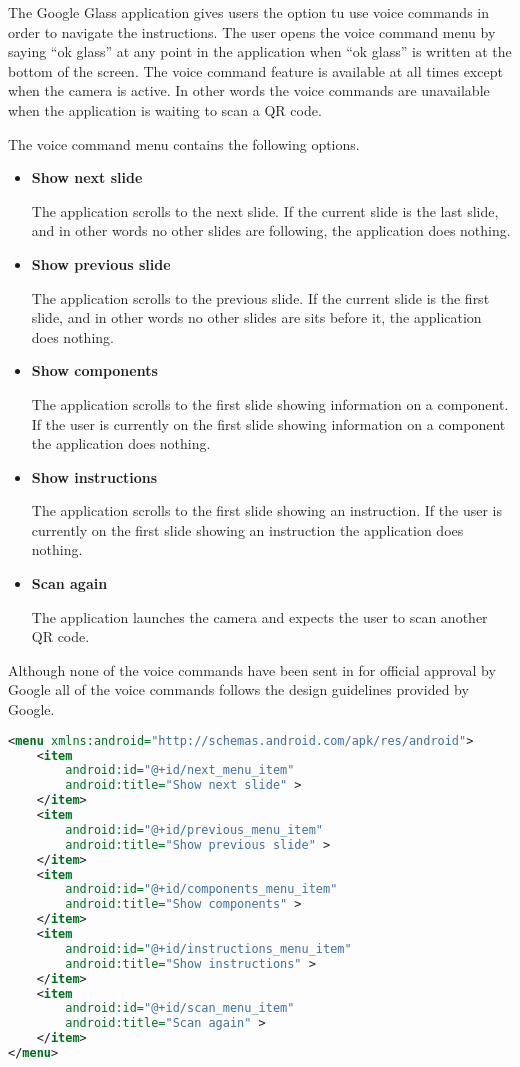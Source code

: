 The Google Glass application gives users the option tu use voice commands in order to navigate the instructions. The user opens the voice command menu by saying ``ok glass'' at any point in the application when ``ok glass'' is written at the bottom of the screen. The voice command feature is available at all times except when the camera is active. In other words the voice commands are unavailable when the application is waiting to scan a QR code.

The voice command menu contains the following options.

\begin{itemize}
	\item \textbf{Show next slide}
	
	The application scrolls to the next slide. If the current slide is the last slide, and in other words no other slides are following, the application does nothing.
	\item \textbf{Show previous slide}
	
	The application scrolls to the previous slide. If the current slide is the first slide, and in other words no other slides are sits before it, the application does nothing.
	\item \textbf{Show components}
	
	The application scrolls to the first slide showing information on a component. If the user is currently on the first slide showing information on a component the application does nothing. 
	\item \textbf{Show instructions}
	
	The application scrolls to the first slide showing an instruction. If the user is currently on the first slide showing an instruction the application does nothing.
	\item \textbf{Scan again}
	
	The application launches the camera and expects the user to scan another QR code.
\end{itemize}

Although none of the voice commands have been sent in for official approval by Google all of the voice commands follows the design guidelines provided by Google.

\begin{lstlisting}[language=XML, caption={The voice command menu XML file}, label=todo]
<menu xmlns:android="http://schemas.android.com/apk/res/android">
	<item
		android:id="@+id/next_menu_item"
		android:title="Show next slide" >
	</item>
	<item
		android:id="@+id/previous_menu_item"
		android:title="Show previous slide" >
	</item>
	<item
		android:id="@+id/components_menu_item"
		android:title="Show components" >
	</item>
	<item
		android:id="@+id/instructions_menu_item"
		android:title="Show instructions" >
	</item>
	<item
		android:id="@+id/scan_menu_item"
		android:title="Scan again" >
	</item>
</menu>
\end{lstlisting}